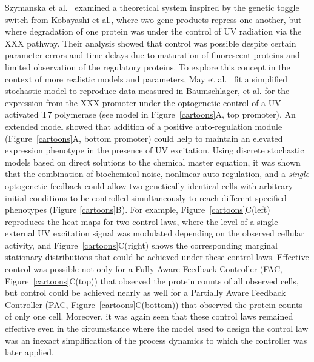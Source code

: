 \documentclass[12pt]{article}
\begin{document}
Szymanska et al.~\cite{Szymanska2015} examined a theoretical system inspired by the genetic toggle switch from Kobayashi et al.\cite{Kobayashi:2004}, where two gene products repress one another, but where degradation of one protein was under the control of UV radiation via the XXX pathway. 
Their analysis showed that control was possible despite certain parameter errors and time delays due to maturation of fluorescent proteins and limited observation of the regulatory proteins. 
To explore this concept in the context of more realistic models and parameters, May et al.~\cite{May2021} fit a simplified stochastic model to reproduce data measured in Baumschlager, et al.\cite{} for the expression from the XXX promoter under the optogenetic control of a UV-activated T7 polymerase (see model in Figure\ \ref{cartoons}A, top promoter). 
An extended model showed that addition of a positive auto-regulation module (Figure\ \ref{cartoons}A, bottom promoter) could help to maintain an elevated expression phenotype in the presence of UV excitation.
Using discrete stochastic models based on direct solutions to the chemical master equation, it was shown that the combination of biochemical noise, nonlinear auto-regulation, and a {\em single} optogenetic feedback could allow two genetically identical cells with arbitrary initial conditions to be controlled simultaneously to reach different specified phenotypes (Figure \ref{cartoons}B). 
For example, Figure\ \ref{cartoons}C(left) reproduces the heat maps for two control laws, where the level of a single external UV excitation signal was modulated depending on the observed cellular activity, and Figure\ \ref{cartoons}C(right) shows the corresponding marginal stationary distributions that could be achieved under these control laws. 
Effective control was possible not only for a Fully Aware Feedback Controller (FAC, Figure\ \ref{cartoons}C(top)) that observed the protein counts of all observed cells, but control could be achieved nearly as well for a Partially Aware Feedback Controller (PAC, Figure\ \ref{cartoons}C(bottom)) that observed the protein counts of only one cell. 
Moreover, it was again seen that these control laws remained effective even in the circumstance where the model used to design the control law was an inexact simplification of the process dynamics to which the controller was later applied.  
\end{document}
